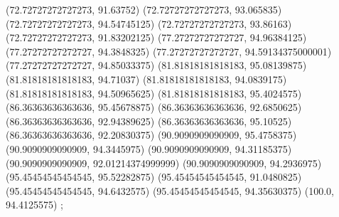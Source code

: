 {{{		(72.72727272727273, 91.63752)
		(72.72727272727273, 93.065835)
		(72.72727272727273, 94.54745125)
		(72.72727272727273, 93.86163)
		(72.72727272727273, 91.83202125)
		(77.27272727272727, 94.96384125)
		(77.27272727272727, 94.3848325)
		(77.27272727272727, 94.59134375000001)
		(77.27272727272727, 94.85033375)
		(81.81818181818183, 95.08139875)
		(81.81818181818183, 94.71037)
		(81.81818181818183, 94.0839175)
		(81.81818181818183, 94.50965625)
		(81.81818181818183, 95.4024575)
		(86.36363636363636, 95.45678875)
		(86.36363636363636, 92.6850625)
		(86.36363636363636, 92.94389625)
		(86.36363636363636, 95.10525)
		(86.36363636363636, 92.20830375)
		(90.9090909090909, 95.4758375)
		(90.9090909090909, 94.3445975)
		(90.9090909090909, 94.31185375)
		(90.9090909090909, 92.01214374999999)
		(90.9090909090909, 94.2936975)
		(95.45454545454545, 95.52282875)
		(95.45454545454545, 91.0480825)
		(95.45454545454545, 94.6432575)
		(95.45454545454545, 94.35630375)
		(100.0, 94.4125575)
	};

}}
